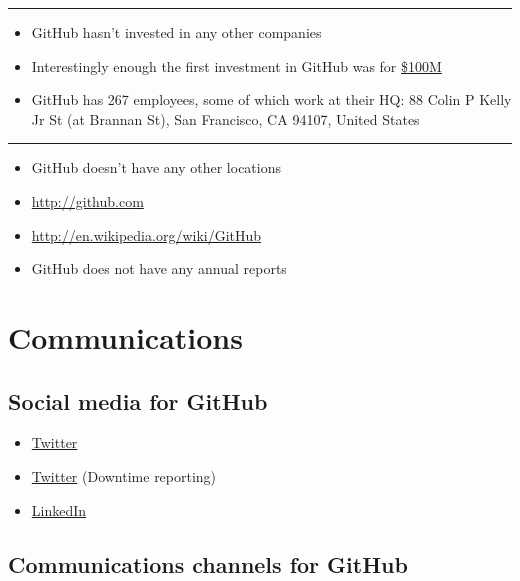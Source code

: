 \begin{center}\rule{3in}{0.4pt}\end{center}

\begin{itemize}
\itemsep1pt\parskip0pt
\item
  GitHub hasn't invested in any other companies
\item
  Interestingly enough the first investment in GitHub was for
  \href{http://go.bloomberg.com/tech-deals/2012-07-09-github-takes-100m-in-largest-investment-by-andreessen-horowitz/}{\$100M}
\item
  GitHub has 267 employees, some of which work at their HQ: 88 Colin P
  Kelly Jr St (at Brannan St), San Francisco, CA 94107, United States
\end{itemize}

\begin{center}\rule{3in}{0.4pt}\end{center}

\begin{itemize}
\itemsep1pt\parskip0pt
\item
  GitHub doesn't have any other locations
\item
  \url{http://github.com}
\item
  \url{http://en.wikipedia.org/wiki/GitHub}
\item
  GitHub does not have any annual reports
\end{itemize}

\section{Communications}\label{communications}

\subsection{Social media for GitHub}\label{social-media-for-github}

\begin{itemize}
\itemsep1pt\parskip0pt
\item
  \href{https://twitter.com/github}{Twitter}
\item
  \href{https://twitter.com/githubstatus}{Twitter} (Downtime reporting)
\item
  \href{https://www.linkedin.com/company/github}{LinkedIn}
\end{itemize}

\subsection{Communications channels for
GitHub}\label{communications-channels-for-github}

